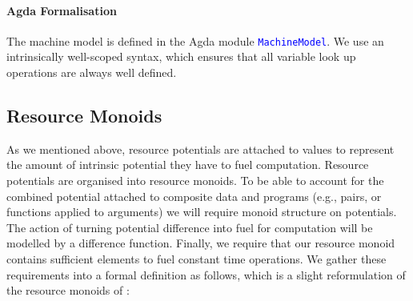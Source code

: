 \documentclass[acmsmall,screen]{acmart}
\newcommand{\AgdaModule}[1]{\textcolor{blue}{\tt #1}}
\begin{document}
\paragraph{Agda Formalisation} The machine model is defined in the
Agda module \AgdaModule{MachineModel}. We use an intrinsically
well-scoped syntax, which ensures that all variable look up operations
are always well defined.

\subsection{Resource Monoids}
\label{sec:resource-monoids}

As we mentioned above, resource potentials are attached to values to
represent the amount of intrinsic potential they have to fuel
computation. Resource potentials are organised into resource
monoids. To be able to account for the combined potential attached to
composite data and programs (e.g., pairs, or functions applied to
arguments) we will require monoid structure on potentials. The action
of turning potential difference into fuel for computation will be
modelled by a difference function. Finally, we require that our
resource monoid contains sufficient elements to fuel constant time
operations. We gather these requirements into a formal definition as
follows, which is a slight reformulation of the resource monoids of
\citet{dallago11realisability}:
\end{document}
